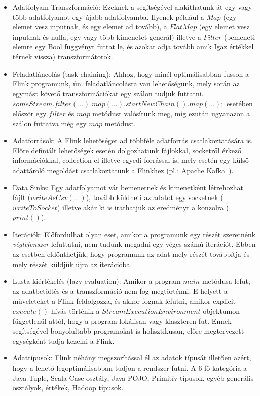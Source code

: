 \documentclass[a4paper,12pt]{article}
\begin{document}
\begin{itemize}
\item Adatfolyam Transzformáció: Ezeknek a segítségével alakíthatunk át egy vagy több adatfolyamot egy újabb adatfolyamba. Ilyenek például a $Map$ (egy elemet vesz inputnak, és egy elemet ad tovább), a $FlatMap$ (egy elemet vesz inputnak és nulla, egy vagy több kimenetet generál) illetve a $Filter$ (bemeneti elemre egy Bool függvényt futtat le, és azokat adja tovább amik Igaz értékkel térnek vissza) transzformátorok.
\item Feladatláncolás (task chaining): Ahhoz, hogy minél optimálisabban fusson a Flink programunk, ún. feladatláncolásra van lehetőségünk, mely során az egymást követő transzformációkat egy szálon tudjuk futtatni. $someStream.filter(...).map(...).startNewChain().map(...);$ esetében először egy $filter$ és $map$ metódust valósítunk meg, míg ezután ugyanazon a szálon futtatva még egy $map$ metódust.
\item Adatforrások: A Flink lehetőséget ad többféle adatforrás csatlakoztatására is. Előre definiált lehetőségek esetén dolgozhatunk fájlokkal, socketről érkező információkkal, collection-el 
illetve egyedi forrással is, mely esetén egy külső adattároló megoldást csatlakoztatunk a Flinkhez (pl.: Apache Kafka~\cite{kafka}).
\item Data Sinks: Egy adatfolyamot vár bemenetnek és kimenetként létrehozhat fájlt ($writeAsCsv(...)$), tovább küldheti az adatot egy socketnek ($writeToSocket$) illetve akár ki is irathatjuk az eredményt a konzolra ($print()$). 
\item Iterációk: Előfordulhat olyan eset, amikor a programunk egy részét szeretnénk \textsl{végtelenszer} lefuttatni, nem tudunk megadni egy véges számú iterációt. Ebben az esetben eldönthetjük, hogy programunk az adat mely részét továbbítja és mely részét küldjük újra az iterációba. 
\item Lusta kiértékelés (lazy evaluation): Amikor a program $main$ metódusa lefut, az adatbetöltés és a transzformáció nem fog megtörténni. E helyett a műveleteket a Flink feldolgozza, és  akkor fognak lefutni, amikor explicit $execute()$ hívás történik a $StreamExecutionEnvironment$ objektumon függetlenül attól, hogy a program lokálisan vagy klaszteren fut. Ennek segítségével bonyolultabb programokat is holisztikusan, előre megtervezett egységként tudja kezelni a Flink.
\item Adattípusok: Flink néhány megszorítással él az adatok típusát illetően azért, hogy a lehető legoptimálisabban tudjon a rendszer futni. A 6 fő kategória a Java Tuple, Scala Case osztály, Java POJO, Primitív típusok, egyéb generális osztályok, értékek, Hadoop típusok.
\end{itemize}
\end{document}
